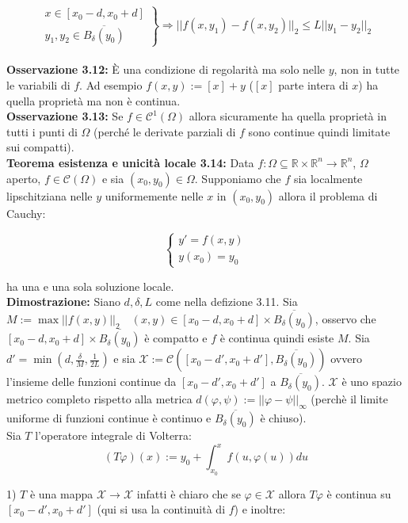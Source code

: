 \documentclass[a4paper,11pt,titlepage]{book}
\begin{document}
$$\left . \begin{array}{ll}
x\in[x_0-d,x_0+d]\\
y_1,y_2\in\overline{B_\delta(y_0)}
\end{array} \right\} \Rightarrow ||f(x,y_1)-f(x,y_2)||_2\leq L||y_1-y_2||_2$$\\

\textbf{Osservazione 3.12:} È una condizione di regolarità ma solo nelle $y$, non in tutte le variabili di $f$. Ad esempio $f(x,y):=[x]+y$ ($[x]$ parte intera di $x$) ha quella proprietà ma non è continua.\\

\textbf{Osservazione 3.13:} Se $f\in\mathcal{C}^1(\Omega)$ allora sicuramente ha quella proprietà in tutti i punti di $\Omega$ (perché le derivate parziali di $f$ sono continue quindi limitate sui compatti).\\

\textbf{Teorema esistenza e unicità locale 3.14:} Data $f:\Omega\subseteq\mathbb{R}\times\mathbb{R}^n \to\mathbb{R}^n$, $\Omega$ aperto, $f\in\mathcal{C}(\Omega)$ e sia $(x_0,y_0)\in\Omega$. Supponiamo che $f$ sia localmente lipschitziana nelle $y$ uniformemente nelle $x$ in $(x_0,y_0)$ allora il problema di Cauchy: 

$$\begin{cases}
y'=f(x,y)\\
y(x_0)=y_0
\end{cases}$$

ha una e una sola soluzione locale.\\

\textbf{Dimostrazione:} Siano $d,\delta,L$ come nella defizione 3.11. Sia $M:=\max||f(x,y)||_2\quad(x,y)\in[x_0-d,x_0+d]\times\overline{B_\delta(y_0)}$, osservo che $[x_0-d,x_0+d]\times\overline{B_\delta(y_0)}$ è compatto e $f$ è continua quindi esiste $M$. Sia $d'=\min(d,\frac{\delta}{M},\frac{1}{2L})$ e sia $\mathcal{X}:=\mathcal{C}([x_0-d',x_0+d'],\overline{B_\delta(y_0)})$ ovvero l'insieme delle funzioni continue da $[x_0-d',x_0+d']$ a $\overline{B_\delta(y_0)}$. $\mathcal{X}$ è uno spazio metrico completo rispetto alla metrica $d(\varphi,\psi):=||\varphi-\psi||_\infty$ (perchè il limite uniforme di funzioni continue è continuo e $\overline{B_\delta(y_0)}$ è chiuso).\\

Sia $T$ l'operatore integrale di Volterra: $$(T\varphi)(x):=y_0+\int_{x_0}^xf(u,\varphi(u))du$$

1) $T$ è una mappa $\mathcal{X}\to\mathcal{X}$ infatti è chiaro che se $\varphi\in\mathcal{X}$ allora $T\varphi$ è continua su $[x_0-d',x_0+d']$ (qui si usa la continuità di $f$) e inoltre:
\end{document}
